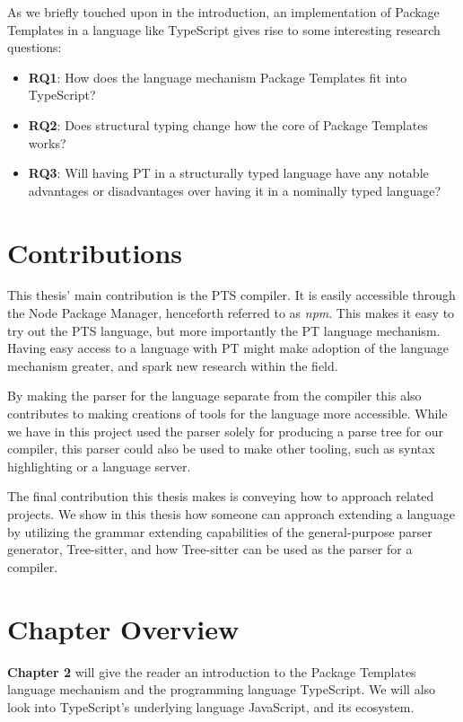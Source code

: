 As we briefly touched upon in the introduction, an implementation of Package Templates in a language like TypeScript gives rise to some interesting research questions:

\begin{itemize}
    \item \textbf{RQ1}: How does the language mechanism Package Templates fit into TypeScript?
    \item \textbf{RQ2}: Does structural typing change how the core of Package Templates works?
    \item \textbf{RQ3}: Will having PT in a structurally typed language have any notable advantages or disadvantages over having it in a nominally typed language?
\end{itemize}

\section{Contributions}\label{sec:contributions}

This thesis' main contribution is the PTS compiler.
It is easily accessible through the Node Package Manager, henceforth referred to as \emph{npm}.
This makes it easy to try out the PTS language, but more importantly the PT language mechanism.
Having easy access to a language with PT might make adoption of the language mechanism greater, and spark new research within the field.

By making the parser for the language separate from the compiler this also contributes to making creations of tools for the language more accessible.
While we have in this project used the parser solely for producing a parse tree for our compiler, this parser could also be used to make other tooling, such as syntax highlighting or a language server.

The final contribution this thesis makes is conveying how to approach related projects.
We show in this thesis how someone can approach extending a language by utilizing the grammar extending capabilities of the general-purpose parser generator, Tree-sitter, and how Tree-sitter can be used as the parser for a compiler.

\section{Chapter Overview}\label{sec:chapter-overview}


\textbf{Chapter 2} will give the reader an introduction to the Package Templates language mechanism and the programming language TypeScript.
We will also look into TypeScript's underlying language JavaScript, and its ecosystem.

